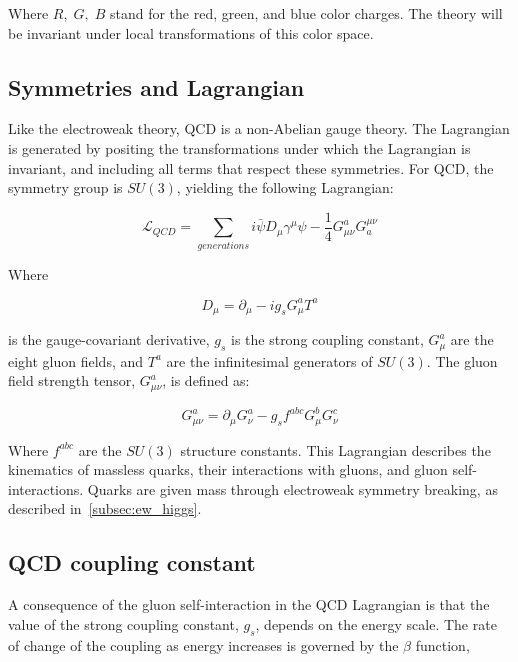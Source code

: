 Where $R,\;G,\;B$ stand for the red, green, and blue color charges.
The theory will be invariant under local transformations of this color space.

\subsection{Symmetries and Lagrangian}\label{subsec:ew_lagrangian}

Like the electroweak theory, QCD is a non-Abelian gauge theory.
The Lagrangian is generated by positing the transformations under which the Lagrangian is invariant,
and including all terms that respect these symmetries.
For QCD, the symmetry group is $SU(3)$, yielding the following Lagrangian:

\begin{equation}\label{eq:qcd_lagrangian}
    \mathcal{L}_{QCD} = \sum_{generations}i\bar{\psi}D_\mu\gamma^\mu\psi-\frac{1}{4}G_{\mu\nu}^a G_a^{\mu\nu}
\end{equation}

Where

\begin{equation}\label{eq:qcd_deriv}
D_\mu = \partial_\mu - i g_s G_\mu^a T^a
\end{equation}

is the gauge-covariant derivative, $g_s$ is the strong coupling constant, $G_\mu^a$ are the eight gluon fields,
and $T^a$ are the infinitesimal generators of $SU(3)$.
The gluon field strength tensor, $G_{\mu\nu}^a$, is defined as:

\begin{equation}\label{eq:qcd_field_strength}
    G_{\mu\nu}^a = \partial_\mu G_\nu^a - g_s f^{abc} G_\mu^b G_\nu ^c
\end{equation}

Where $f^{abc}$ are the $SU(3)$ structure constants.
This Lagrangian describes the kinematics of massless quarks, their interactions with gluons, and gluon self-interactions.
Quarks are given mass through electroweak symmetry breaking, as described in~\ref{subsec:ew_higgs}.

\subsection{QCD coupling constant}\label{subsec:qcd_coupling}

A consequence of the gluon self-interaction in the QCD Lagrangian is that the value of the strong coupling constant,
$g_s$, depends on the energy scale.
The rate of change of the coupling as energy increases is governed by the $\beta$ function,

